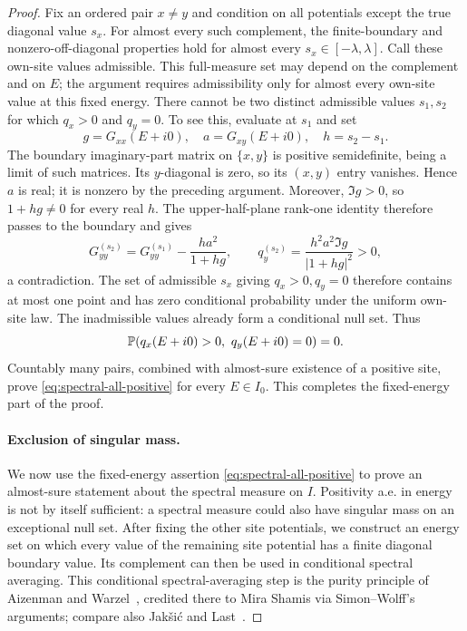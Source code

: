 \begin{proof}
Fix an ordered pair $x\ne y$ and condition on all potentials
except the true diagonal value $s_x$. For almost every such
complement, the finite-boundary and nonzero-off-diagonal
properties hold for almost every $s_x\in[-\lambda,\lambda]$.
Call these own-site values admissible. This full-measure set
may depend on the complement and on $E$; the argument requires
admissibility only for almost every own-site value at this fixed energy.
There cannot be two distinct admissible values $s_1,s_2$ for
which $q_x>0$ and $q_y=0$. To see this, evaluate at $s_1$ and set
\[
 g=G_{xx}(E+i0),\quad a=G_{xy}(E+i0),\quad h=s_2-s_1.
\]
The boundary imaginary-part matrix on $\{x,y\}$ is positive
semidefinite, being a limit of such matrices.
Its $y$-diagonal is zero, so its $(x,y)$ entry vanishes. Hence
$a$ is real; it is nonzero by the preceding argument. Moreover,
$\Im g>0$, so $1+hg\ne0$ for every real $h$.
The upper-half-plane rank-one identity therefore passes to the
boundary and gives
\[
 G_{yy}^{(s_2)}=G_{yy}^{(s_1)}-\frac{h a^2}{1+hg},
 \qquad
 q_y^{(s_2)}=\frac{h^2a^2\Im g}{|1+hg|^2}>0,
\]
a contradiction. The set of admissible $s_x$ giving
$q_x>0,q_y=0$ therefore contains at most one point and has zero
conditional probability under the uniform own-site law. The
inadmissible values already form a conditional null set. Thus
\[
 \mathbb P(q_x(E+i0)>0,\ q_y(E+i0)=0)=0.
\]
Countably many pairs, combined with almost-sure existence of a
positive site, prove \eqref{eq:spectral-all-positive} for every
$E\in I_0$. This completes the fixed-energy part of the proof.

\paragraph{Exclusion of singular mass.}
We now use the fixed-energy assertion \eqref{eq:spectral-all-positive}
to prove an almost-sure statement about the spectral measure on $I$.
Positivity a.e. in energy is not by itself sufficient: a spectral
measure could also have singular mass on an exceptional null set.
After fixing the other site potentials, we construct an energy set on
which every value of the remaining site potential has a finite diagonal
boundary value. Its complement can then be used in conditional spectral
averaging.
This conditional spectral-averaging step is the purity principle of
Aizenman and Warzel~\cite[Proposition~2.2]{AizenmanWarzel2013}, credited
there to Mira Shamis via Simon--Wolff's arguments; compare also
Jak\v{s}i\'c and Last~\cite[author-preprint Section~4]{JaksicLast2000}.


\end{proof}

